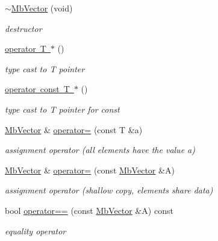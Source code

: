\begin{DoxyCompactItemize}
\mbox{\hyperlink{class_mb_vector_ac1e7793d625f395232e8d2c1479f065d}{$\sim$\+Mb\+Vector}} (void)
\begin{DoxyCompactList}\small\item\em destructor \end{DoxyCompactList}\item 
\mbox{\label{class_mb_vector_afecf672c7a4563b6c1534dfc3a2b3ef5}} 
\mbox{\hyperlink{class_mb_vector_afecf672c7a4563b6c1534dfc3a2b3ef5}{operator T $\ast$}} ()
\begin{DoxyCompactList}\small\item\em type cast to T pointer \end{DoxyCompactList}\item 
\mbox{\label{class_mb_vector_a9c6f9b64b62048b36c2ee889bd4e921c}} 
\mbox{\hyperlink{class_mb_vector_a9c6f9b64b62048b36c2ee889bd4e921c}{operator const T $\ast$}} ()
\begin{DoxyCompactList}\small\item\em type cast to T pointer for const \end{DoxyCompactList}\item 
\mbox{\hyperlink{class_mb_vector}{Mb\+Vector}} \& \mbox{\hyperlink{class_mb_vector_a1ffe936bb9037ce910da8a095782a929}{operator=}} (const T \&a)
\begin{DoxyCompactList}\small\item\em assignment operator (all elements have the value a) \end{DoxyCompactList}\item 
\mbox{\label{class_mb_vector_af75698d54f82729644619a277606762b}} 
\mbox{\hyperlink{class_mb_vector}{Mb\+Vector}} \& \mbox{\hyperlink{class_mb_vector_af75698d54f82729644619a277606762b}{operator=}} (const \mbox{\hyperlink{class_mb_vector}{Mb\+Vector}} \&A)
\begin{DoxyCompactList}\small\item\em assignment operator (shallow copy, elements share data) \end{DoxyCompactList}\item 
bool \mbox{\hyperlink{class_mb_vector_a8f2620606cadfa0e0ba937fd4725ac3c}{operator==}} (const \mbox{\hyperlink{class_mb_vector}{Mb\+Vector}} \&A) const
\begin{DoxyCompactList}\small\item\em equality operator \end{DoxyCompactList}\item 

\end{DoxyCompactItemize}
